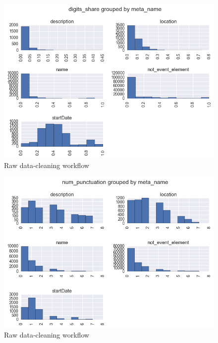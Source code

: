 \begin{figure}[h]
\begin{center}
\includegraphics[width=1.0\textwidth]{figures/distrDigitPropByMeta}
\caption{Raw data-cleaning workflow}
\label{fig:distrDigitPropByMeta}
\end{center}
\end{figure}

\begin{figure}[h]
\begin{center}
\includegraphics[width=1.0\textwidth]{figures/distrPunctByMeta}
\caption{Raw data-cleaning workflow}
\label{fig:distrPunctByMeta}
\end{center}
\end{figure}



\label{append}